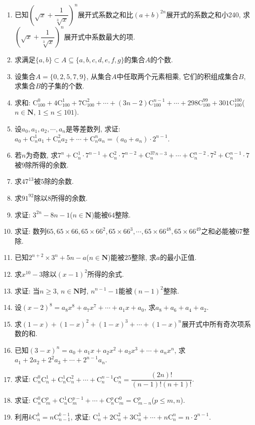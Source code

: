 \documentclass[10pt,a4paper]{article}
\begin{document}
\begin{enumerate}[1.]
\item 已知$(\sqrt x+\dfrac 1{\sqrt[3]x})^n$展开式系数之和比$(a+b)^{2n}$展开式的系数之和小240, 求$(\sqrt x+\dfrac 1{\sqrt[3]x})^n$展开式中系数最大的项.
\item 求满足$\{a,b\}\subset A\subseteq \{a,b,c,d,e,f,g\}$的集合$A$的个数.
\item 设集合$A=\{0,2,5,7,9\}$, 从集合$A$中任取两个元素相乘, 它们的积组成集合$B$, 求集合$B$的子集的个数.
\item 求和: $\mathrm{C}_{100}^0+4\mathrm{C}_{100}^1+7\mathrm{C}_{100}^2+\cdots +(3n-2)\mathrm{C}_{100}^{n-1}+\cdots +298\mathrm{C}_{100}^{99}+301\mathrm{C}_{100}^{100}$($n\in \mathbf{N}$, $1\le n\le 101$).
\item 设$a_0, a_1, a_2, \cdots,a_n$是等差数列, 求证: $a_0+\mathrm{C}_n^1a_1+\mathrm{C}_n^2a_2+\cdots +\mathrm{C}_n^na_n=(a_0+a_n)\cdot 2^{n-1}$.
\item 若$n$为奇数, 求$7^n+\mathrm{C}_n^1\cdot 7^{n-1}+\mathrm{C}_n^2\cdot 7^{n-2}+\mathrm{C}_n^37^{n-3}+\cdots +\mathrm{C}_n^{n-2}\cdot 7^2+\mathrm{C}_n^{n-1}\cdot 7$被$9$除所得的余数.
\item 求$47^{13}$被$5$除的余数.
\item 求$91^{92}$除以$8$所得的余数.
\item 求证: $3^{2n}-8n-1$($n\in \mathbf{N}$)能被$64$整除.
\item 求证: 数列$65,65\times 66, 65\times 66^2, 65\times 66^3, \cdots, 65\times 66^{48}, 65\times 66^{49}$之和必能被$67$整除.
\item 已知$2^{n+2}\times 3^n+5n-a$($n\in \mathbf{N}$)能被$25$整除, 求$a$的最小正值.
\item 求$x^{10}-3$除以$(x-1)^2$所得的余式.
\item 求证: 当$n\ge 3$, $n\in \mathbf{N}$时, $n^{n-1}-1$能被$(n-1)^2$整除.
\item 设$(x-2)^8=a_8x^8+a_7x^7+\cdots +a_1x+a_0$, 求$a_8+a_6+a_4+a_2$.
\item 求$(1-x)+(1-x)^2+(1-x)^3+\cdots +(1-x)^n$展开式中所有奇次项系数的和.
\item 已知$(3-x)^n=a_0+a_1x+a_2x^2+a_3x^3+\cdots +a_nx^n$, 求$a_1+2a_2+2^2a_3+\cdots +2^{n-1}a_n$.
\item 求证: $\mathrm{C}_n^0\mathrm{C}_n^1+\mathrm{C}_n^1\mathrm{C}_n^2+\cdots +\mathrm{C}_n^{n-1}\mathrm{C}_n^n=\dfrac{(2n)!}{(n-1)!(n+1)!}$.
\item 求证: $\mathrm{C}_n^0\mathrm{C}_m^p+\mathrm{C}_n^1\mathrm{C}_m^{p-1}+\cdots +\mathrm{C}_n^p\mathrm{C}_m^0=\mathrm{C}_{m-n}^p$($p\le m,n$).
\item 利用$k\mathrm{C}_n^k=n\mathrm{C}_{n-1}^{k-1}$, 求证: $\mathrm{C}_n^1+2\mathrm{C}_n^2+3\mathrm{C}_n^3+\cdots +n\mathrm{C}_n^n=n\cdot 2^{n-1}$.

\end{enumerate}
\end{document}
